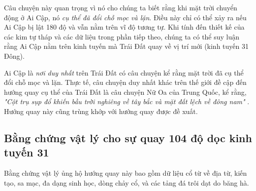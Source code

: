 \documentclass[10pt,twocolumn,letterpaper]{article}
\begin{document}
Câu chuyện này quan trọng vì nó cho chúng ta biết rằng khi mặt trời chuyển động ở Ai Cập, nó \textit{cụ thể đã đổi chỗ mọc và lặn}. Điều này chỉ có thể xảy ra nếu Ai Cập bị lật 180 độ và vẫn nằm trên vĩ độ tương tự. Khi tính đến thiết kế của các kim tự tháp và các dữ liệu trong phần tiếp theo, chúng ta có thể suy luận rằng Ai Cập nằm trên kinh tuyến mà Trái Đất quay về vị trí mới (kinh tuyến 31 Đông).

Ai Cập là \textit{nơi duy nhất} trên Trái Đất có câu chuyện kể rằng mặt trời đã cụ thể đổi chỗ mọc và lặn. Thực tế, câu chuyện duy nhất khác trên thế giới đề cập đến hướng quay cụ thể của Trái Đất là câu chuyện Nữ Oa của Trung Quốc, kể rằng, \textit{"Cột trụ sụp đổ khiến bầu trời nghiêng về tây bắc và mặt đất lệch về đông nam"} \cite{8}. Hướng quay này cũng trùng khớp với hướng quay được đề xuất.

\subsection{Bằng chứng vật lý cho sự quay 104 độ dọc kinh tuyến 31}

Bằng chứng vật lý ủng hộ hướng quay này bao gồm dữ liệu cổ từ về địa từ, kiến tạo, sa mạc, đa dạng sinh học, dòng chảy cổ, và các tảng đá trôi dạt do băng hà.
\end{document}
